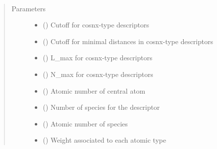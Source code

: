 \documentclass[letterpaper,10pt,english]{sphinxmanual}
\begin{document}

\begin{fulllineitems}
\label{\detokenize{descriptors:gap.descriptors.cosnx}}~\begin{quote}\begin{description}
\item[{Parameters}] \leavevmode\begin{itemize}
\item {} 
 () \textendash{} Cutoff for cosnx-type descriptors

\item {} 
 () \textendash{} Cutoff for minimal distances in cosnx-type descriptors

\item {} 
 () \textendash{} L\_max for cosnx-type descriptors

\item {} 
 () \textendash{} N\_max for cosnx-type descriptors

\item {} 
 () \textendash{} Atomic number of central atom

\item {} 
 () \textendash{} Number of species for the descriptor

\item {} 
 (\sphinxstyleliteralemphasis{\sphinxupquote{)}}) \textendash{} Atomic number of species

\item {} 
 (\sphinxstyleliteralemphasis{\sphinxupquote{)}}) \textendash{} Weight associated to each atomic type

\end{itemize}

\end{description}\end{quote}

\end{fulllineitems}
\end{document}
